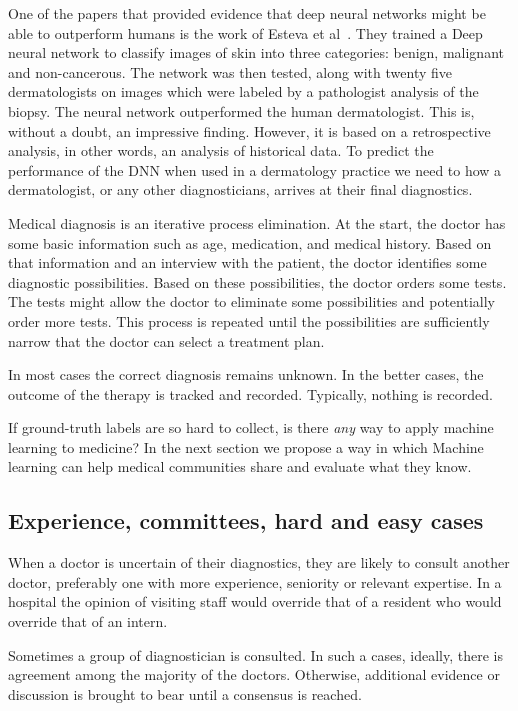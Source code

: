 \documentclass[fleqn,10pt]{wlscirep}
\begin{document}
One of the papers that provided evidence that deep neural networks might be able to outperform humans is the work of Esteva et al~\cite{esteva2017dermatologist}. They trained a Deep neural network to classify images of skin into three categories: benign, malignant and non-cancerous. The network was then tested, along with twenty five dermatologists on images which were labeled by a pathologist analysis of the biopsy. The neural network outperformed the human dermatologist. This is, without a doubt, an impressive finding. However, it is based on a retrospective analysis, in other words, an analysis of historical data. To predict the performance of the DNN when used in a dermatology practice we need to how a dermatologist, or any other diagnosticians, arrives at their final diagnostics.

Medical diagnosis is an iterative process elimination. At the start, the doctor has some basic information such as age, medication, and medical history. Based on that information and an interview with the patient, the doctor identifies some diagnostic possibilities. Based on these possibilities, the doctor orders some tests. The tests might allow the doctor to eliminate some possibilities and potentially order more tests. This process is repeated until the possibilities are sufficiently narrow that the doctor can select a treatment plan. 

In most cases the correct diagnosis remains unknown. In the better cases, the outcome of the therapy is tracked and recorded. Typically, nothing is recorded.

If ground-truth labels are so hard to collect, is there {\em any} way to apply machine learning to medicine?
In the next section we propose a way in which  Machine learning can help medical communities
share and evaluate what they know.

\subsection*{Experience, committees, hard and easy cases}

When a doctor is uncertain of their diagnostics, they are likely to consult another doctor, preferably one with more experience, seniority or relevant expertise. In a hospital the opinion of visiting staff would override that of a resident who would override that of an intern.

Sometimes a group of diagnostician is consulted. In such a cases, ideally, there is agreement among the majority of the doctors. Otherwise, additional evidence or discussion is brought to bear until a consensus is reached.
\end{document}
